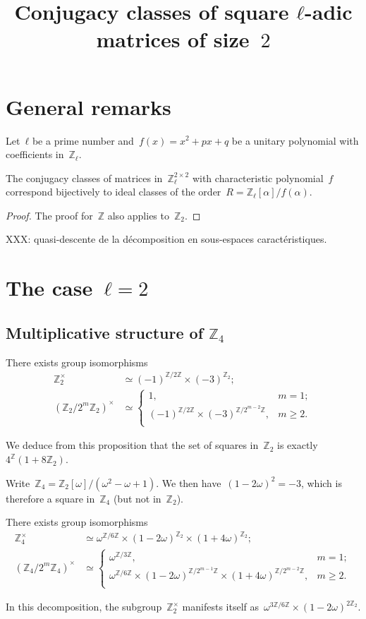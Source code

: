 \documentclass{article}
\begin{document}
\title{Conjugacy classes of square $ℓ$-adic matrices of size~$2$}

\section{General remarks}

Let~$ℓ$ be a prime number and~$f(x) = x^2 + px + q$ be a unitary
polynomial with coefficients in~$ℤ_{ℓ}$.

\begin{prop}
The conjugacy classes of matrices in~$ℤ_{ℓ}^{2×2}$ with characteristic
polynomial~$f$ correspond bijectively to ideal classes of the order~$R =
ℤ_{ℓ}[α] / f(α)$.
\end{prop}

\begin{proof}
The proof for~$ℤ$ also applies to~$ℤ_2$.
\end{proof}

XXX: quasi-descente de la décomposition en sous-espaces caractéristiques.

\section{The case~$ℓ = 2$}


\subsection{Multiplicative structure of $ℤ_4$}


\begin{prop}
There exists group isomorphisms
\begin{align*}
ℤ_2^{×} &≃ (-1)^{ℤ/2ℤ} × (-3)^{ℤ_2};\\
(ℤ_2/2^m ℤ_2)^{×} &≃ \begin{cases} 1, & m = 1;\\
(-1)^{ℤ/2ℤ} × (-3)^{ℤ/2^{m-2}ℤ},& m ≥ 2.\\\end{cases}
\end{align*}
\end{prop}

We deduce from this proposition that the set of squares in~$ℤ_2$ is
exactly~$4^{ℤ} (1 + 8 ℤ_2)$.

Write~$ℤ_4 = ℤ_2[ω]/(ω^2-ω+1)$. We then have~$(1-2ω)^2 = -3$, which is
therefore a square in~$ℤ_4$ (but not in~$ℤ_2$).

\begin{prop}
There exists group isomorphisms
\begin{align*}
ℤ_4^{×} &≃ ω^{ℤ/6ℤ} × (1 - 2 ω)^{ℤ_2} × (1 + 4 ω)^{ℤ_2};\\
(ℤ_4/2^m ℤ_4)^{×} &≃ \begin{cases} ω^{ℤ/3ℤ},& m = 1;\\
ω^{ℤ/6ℤ} × (1-2ω)^{ℤ/2^{m-1}ℤ} × (1+4ω)^{ℤ/2^{m-2}ℤ}, & m ≥ 2.\\ \end{cases}
\end{align*}
\end{prop}
In this decomposition, the subgroup~$ℤ_2^{×}$ manifests itself
as~$ω^{3ℤ/6ℤ} × (1-2ω)^{2 ℤ_2}$.
\end{document}
